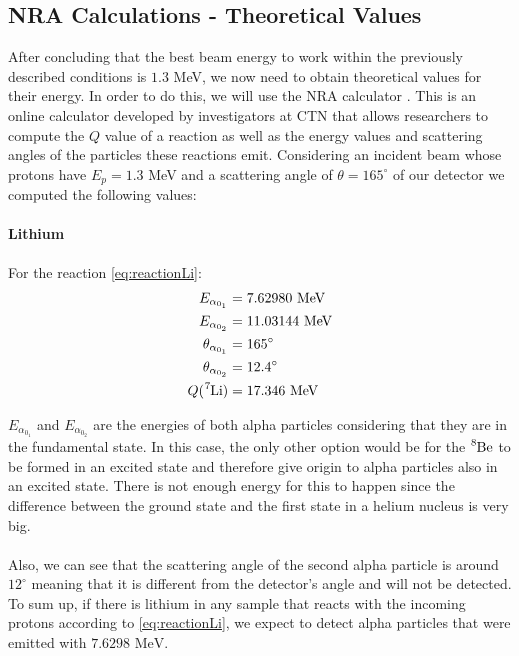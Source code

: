 \documentclass{article}
\begin{document}
\begin{multicols}{2}
\subsection{NRA Calculations - Theoretical Values}
    \label{sec:theoreticalvalues}

After concluding that the best beam energy to work within the previously described conditions is $1.3$ MeV, we now need to obtain theoretical values for their energy. In order to do this, we will use the NRA calculator \cite{NRAEnergyCalc}. This is an online calculator developed by investigators at CTN that allows researchers to compute the $Q$ value of a reaction as well as the energy values and scattering angles of the particles these reactions emit. Considering an incident beam whose protons have $E_p = 1.3$ MeV and a scattering angle of $\theta = 165 ^{\circ}$ of our detector we computed the following values:

\paragraph{Lithium} For the reaction \ref{eq:reactionLi}:
\begin{equation}
\begin{split}
  E_{\alpha_{0_1}} &= 7.62980 \text{ MeV} \\
  E_{\alpha_{0_2}} &= 11.03144 \text{ MeV} \\
  \theta_{\alpha_{0_1}} &= 165 ^{\circ} \\
  \theta_{\alpha_{0_2}} &= 12.4 ^{\circ} \\
  Q (\ce{^7Li}) &= 17.346 \text{ MeV} \\
\end{split}
\label{eq:energiesli}
\end{equation}

$E_{\alpha_{0_1}}$ and $E_{\alpha_{0_2}}$ are the energies of both alpha particles considering that they are in the fundamental state. 
In this case, the only other option would be for the $\ce{^8Be}$ to be formed in an excited state and therefore give origin to alpha particles also in an excited state. 
There is not enough energy for this to happen since the difference between the ground state and the first state in a helium nucleus is very big.
\paragraph{}
Also, we can see that the scattering angle of the second alpha particle is around $12 ^{\circ}$ meaning that it is different from the detector's angle and will not be detected. To sum up, if there is lithium in any sample that reacts with the incoming protons according to \ref{eq:reactionLi}, we expect to detect alpha particles that were emitted with $7.6298 \text{ MeV}$.


\end{multicols}
\end{document}
